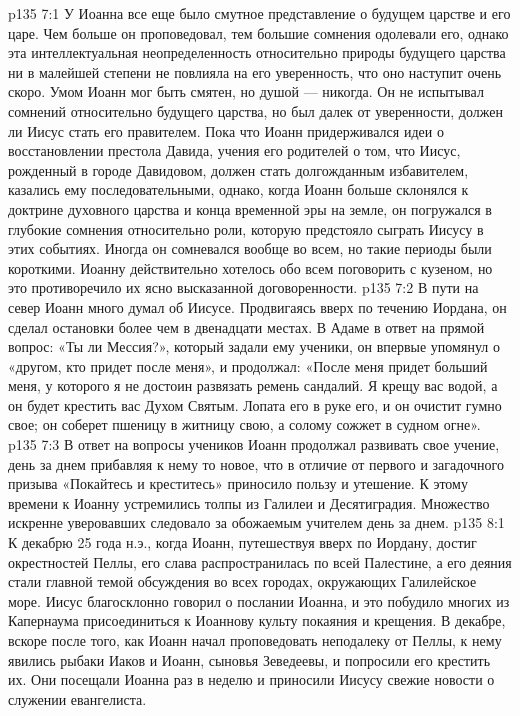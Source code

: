 \vs p135 7:1 У Иоанна все еще было смутное представление о будущем царстве и его царе. Чем больше он проповедовал, тем большие сомнения одолевали его, однако эта интеллектуальная неопределенность относительно природы будущего царства ни в малейшей степени не повлияла на его уверенность, что оно наступит очень скоро. Умом Иоанн мог быть смятен, но душой --- никогда. Он не испытывал сомнений относительно будущего царства, но был далек от уверенности, должен ли Иисус стать его правителем. Пока что Иоанн придерживался идеи о восстановлении престола Давида, учения его родителей о том, что Иисус, рожденный в городе Давидовом, должен стать долгожданным избавителем, казались ему последовательными, однако, когда Иоанн больше склонялся к доктрине духовного царства и конца временной эры на земле, он погружался в глубокие сомнения относительно роли, которую предстояло сыграть Иисусу в этих событиях. Иногда он сомневался вообще во всем, но такие периоды были короткими. Иоанну действительно хотелось обо всем поговорить с кузеном, но это противоречило их ясно высказанной договоренности.
\vs p135 7:2 \pc В пути на север Иоанн много думал об Иисусе. Продвигаясь вверх по течению Иордана, он сделал остановки более чем в двенадцати местах. В Адаме в ответ на прямой вопрос: «Ты ли Мессия?», который задали ему ученики, он впервые упомянул о «другом, кто придет после меня», и продолжал: «После меня придет больший меня, у которого я не достоин развязать ремень сандалий. Я крещу вас водой, а он будет крестить вас Духом Святым. Лопата его в руке его, и он очистит гумно свое; он соберет пшеницу в житницу свою, а солому сожжет в судном огне».
\vs p135 7:3 В ответ на вопросы учеников Иоанн продолжал развивать свое учение, день за днем прибавляя к нему то новое, что в отличие от первого и загадочного призыва «Покайтесь и креститесь» приносило пользу и утешение. К этому времени к Иоанну устремились толпы из Галилеи и Десятиградия. Множество искренне уверовавших следовало за обожаемым учителем день за днем.
\vs p135 8:1 К декабрю 25 года н.э., когда Иоанн, путешествуя вверх по Иордану, достиг окрестностей Пеллы, его слава распространилась по всей Палестине, а его деяния стали главной темой обсуждения во всех городах, окружающих Галилейское море. Иисус благосклонно говорил о послании Иоанна, и это побудило многих из Капернаума присоединиться к Иоаннову культу покаяния и крещения. В декабре, вскоре после того, как Иоанн начал проповедовать неподалеку от Пеллы, к нему явились рыбаки Иаков и Иоанн, сыновья Зеведеевы, и попросили его крестить их. Они посещали Иоанна раз в неделю и приносили Иисусу свежие новости о служении евангелиста.
